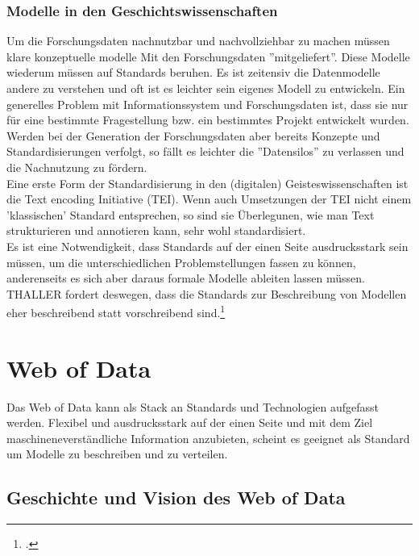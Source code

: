 \documentclass[12pt,a4paper]{article}
\begin{document}
\subsubsection{Modelle in den Geschichtswissenschaften}

Um die Forschungsdaten nachnutzbar und nachvollziehbar zu machen müssen klare konzeptuelle modelle Mit den Forschungsdaten ''mitgeliefert''. Diese Modelle wiederum müssen auf Standards beruhen. Es ist zeitensiv die Datenmodelle andere zu verstehen und oft ist es leichter sein eigenes Modell zu entwickeln. Ein generelles Problem mit Informationssystem und Forschungsdaten ist, dass sie nur für eine bestimmte Fragestellung bzw. ein bestimmtes Projekt entwickelt wurden. Werden bei der Generation der Forschungsdaten aber bereits Konzepte und Standardisierungen verfolgt, so fällt es leichter die ''Datensilos'' zu verlassen und die Nachnutzung zu fördern. 
\\
Eine erste Form der Standardisierung in den (digitalen) Geisteswissenschaften ist die Text encoding Initiative (TEI). Wenn auch Umsetzungen der TEI nicht einem 'klassischen' Standard entsprechen, so sind sie Überlegunen, wie man Text strukturieren und annotieren kann, sehr wohl standardisiert. 
\\
Es ist eine Notwendigkeit, dass Standards auf der einen Seite ausdrucksstark sein müssen, um die unterschiedlichen Problemstellungen fassen zu können, anderenseits es sich aber daraus formale Modelle ableiten lassen müssen. THALLER fordert deswegen, dass die Standards zur Beschreibung von Modellen eher beschreibend statt  vorschreibend sind.\footcite[][S.204]{thaller2017need}

\section{Web of Data}

Das Web of Data kann als Stack an Standards und Technologien aufgefasst werden. Flexibel und ausdrucksstark auf der einen Seite und mit dem Ziel maschineneverständliche Information anzubieten, scheint es geeignet als Standard um Modelle zu beschreiben und zu verteilen.

\subsection{Geschichte und Vision des Web of Data}
\end{document}
